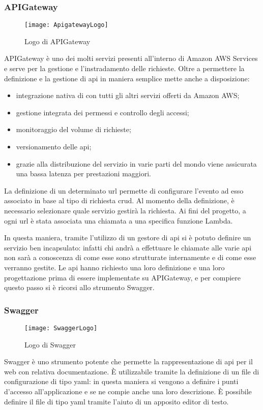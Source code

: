 \newpage

\subsubsection{APIGateway}
\begin{figure}[H]
  \centering
  \texttt{[image: ApigatewayLogo]}
  \caption{Logo di APIGateway}
\end{figure}
APIGateway è uno dei molti servizi presenti all'interno di Amazon AWS Services
e serve per la gestione e l'instradamento delle richieste.
Oltre a permettere la definizione e la gestione di \gls{api} in maniera
semplice mette anche a disposizione:
\begin{itemize}
  \item integrazione nativa di con tutti gli altri servizi offerti da Amazon
AWS;
  \item gestione integrata dei permessi e controllo degli accessi;
  \item monitoraggio del volume di richieste;
  \item versionamento delle \gls{api};
  \item grazie alla distribuzione del servizio in varie parti del mondo viene
assicurata una bassa latenza per prestazioni maggiori.
\end{itemize}
La definizione di un determinato \gls{url} permette di configurare l'evento ad
esso associato in base al tipo di richiesta \gls{crud}. Al momento della
definizione, è necessario selezionare quale servizio gestirà la richiesta. Ai
fini del progetto, a ogni \gls{url} è stata associata una chiamata a una
specifica funzione Lambda.

In questa maniera, tramite l'utilizzo di un gestore di \gls{api} si è potuto
definire un servizio  ben incapsulato: infatti
chi andrà a effettuare le chiamate alle varie \gls{api} non sarà a conoscenza di
come esse sono strutturate internamente e di come esse verranno gestite.
Le \gls{api} hanno richiesto una loro definizione e una loro progettazione
prima di essere implementate su APIGateway, e per compiere questo passo si è
ricorsi allo strumento Swagger.


\subsubsection{Swagger}
\begin{figure}[H]
  \centering
  \texttt{[image: SwaggerLogo]}
  \caption{Logo di Swagger}
\end{figure}
Swagger è uno strumento potente che permette la rappresentazione di \gls{api}
per il web con relativa documentazione. È utilizzabile tramite la definizione
di un file di configurazione di tipo \gls{yaml}: in questa maniera si vengono a
definire i punti d'accesso all'applicazione e se ne compie anche una loro
descrizione. È possibile definire il file di tipo \gls{yaml} tramite l'aiuto di
un apposito editor di testo.

